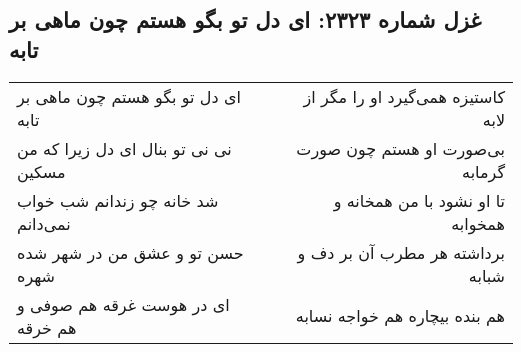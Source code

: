 \begin{center}
\section*{غزل شماره ۲۳۲۳: ای دل تو بگو هستم چون ماهی بر تابه}
\label{sec:2323}
\begin{longtable}{l p{0.5cm} r}
ای دل تو بگو هستم چون ماهی بر تابه
&&
کاستیزه همی‌گیرد او را مگر از لابه
\\
نی نی تو بنال ای دل زیرا که من مسکین
&&
بی‌صورت او هستم چون صورت گرمابه
\\
شد خانه چو زندانم شب خواب نمی‌دانم
&&
تا او نشود با من همخانه و همخوابه
\\
حسن تو و عشق من در شهر شده شهره
&&
برداشته هر مطرب آن بر دف و شبابه
\\
ای در هوست غرقه هم صوفی و هم خرقه
&&
هم بنده بیچاره هم خواجه نسابه
\\
\end{longtable}
\end{center}
